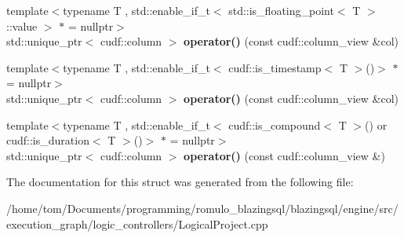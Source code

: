\begin{DoxyCompactItemize}
{\footnotesize template$<$typename T , std\+::enable\+\_\+if\+\_\+t$<$ std\+::is\+\_\+floating\+\_\+point$<$ T $>$\+::value $>$ $\ast$  = nullptr$>$ }\\std\+::unique\+\_\+ptr$<$ cudf\+::column $>$ {\bfseries operator()} (const cudf\+::column\+\_\+view \&col)
\item 
\mbox{\label{structral_1_1processor_1_1strings_1_1cast__to__str__functor_ada42b05ccacb321248b8321987eb6f29}} 
{\footnotesize template$<$typename T , std\+::enable\+\_\+if\+\_\+t$<$ cudf\+::is\+\_\+timestamp$<$ T $>$()$>$ $\ast$  = nullptr$>$ }\\std\+::unique\+\_\+ptr$<$ cudf\+::column $>$ {\bfseries operator()} (const cudf\+::column\+\_\+view \&col)
\item 
\mbox{\label{structral_1_1processor_1_1strings_1_1cast__to__str__functor_a5f2931bb32a8459a3e7bb9c1422593ab}} 
{\footnotesize template$<$typename T , std\+::enable\+\_\+if\+\_\+t$<$ cudf\+::is\+\_\+compound$<$ T $>$() or cudf\+::is\+\_\+duration$<$ T $>$()$>$ $\ast$  = nullptr$>$ }\\std\+::unique\+\_\+ptr$<$ cudf\+::column $>$ {\bfseries operator()} (const cudf\+::column\+\_\+view \&)
\end{DoxyCompactItemize}


The documentation for this struct was generated from the following file\+:\begin{DoxyCompactItemize}
\item 
/home/tom/\+Documents/programming/romulo\+\_\+blazingsql/blazingsql/engine/src/execution\+\_\+graph/logic\+\_\+controllers/Logical\+Project.\+cpp\end{DoxyCompactItemize}
